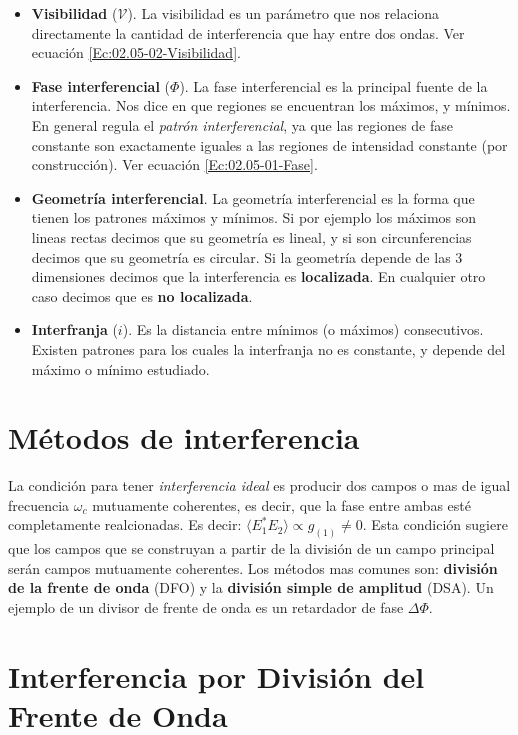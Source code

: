 \documentclass[12pt,a4paper]{book}
\numberwithin{equation}{section}
\numberwithin{figure}{section}
\newcommand{\1}{_{(1)}}
\newcommand{\2}{_{(2)}}
\theoremstyle{definition}
\begin{document}
\begin{itemize}
\item \textbf{Visibilidad} ($\mathcal{V}$). La visibilidad es un parámetro que nos relaciona directamente la cantidad de interferencia que hay entre dos ondas. Ver ecuación \ref{Ec:02.05-02-Visibilidad}. 
\item \textbf{Fase interferencial} ($\Phi$). La fase interferencial es la principal fuente de la interferencia. Nos dice en que regiones se encuentran los máximos, y mínimos. En general regula el \textit{patrón interferencial}, ya que las regiones de fase constante son exactamente iguales a las regiones de intensidad constante (por construcción). Ver ecuación \ref{Ec:02.05-01-Fase}. 
\item \textbf{Geometría interferencial}. La geometría interferencial es la forma que tienen los patrones máximos y mínimos. Si por ejemplo los máximos son lineas rectas decimos que su geometría es lineal, y si son circunferencias decimos que su geometría es circular. Si la geometría depende de las 3 dimensiones decimos que la interferencia es \textbf{localizada}. En cualquier otro caso decimos que es \textbf{no localizada}.
\item \textbf{Interfranja} ($i$). Es la distancia entre mínimos (o máximos) consecutivos. Existen patrones para los cuales la interfranja no es constante, y depende del máximo o mínimo estudiado. 
\end{itemize}

\section{Métodos de interferencia}

La condición para tener  \textit{interferencia ideal} es producir dos campos o mas de igual frecuencia $\omega_c$ mutuamente coherentes, es decir, que la fase entre ambas esté completamente realcionadas. Es decir: $\langle E_1^* E_2 \rangle \varpropto g\1 \neq 0$. Esta condición sugiere que los campos que se construyan a partir de la división de un campo principal serán campos mutuamente coherentes. Los métodos mas comunes son: \textbf{división de la frente de onda} (DFO) y la  \textbf{división simple de amplitud} (DSA). Un ejemplo de un divisor de frente de onda es un retardador de fase $\Delta \Phi$.

\section{Interferencia por División del Frente de Onda}
\end{document}
